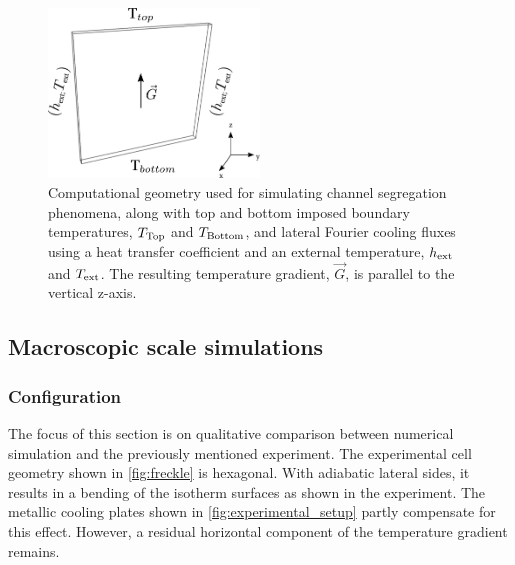 \begin{figure}[htbp]
\centering
\includegraphics[width=0.5\textwidth]{Chapter4/Graphics/freckle_fe/config.pdf}
\captionsetup{singlelinecheck=off}
\caption[.]{Computational geometry used for simulating channel segregation phenomena, along with top and bottom imposed boundary temperatures, $T_{\text{Top}}$
and $T_{\text{Bottom}}$, and lateral Fourier cooling fluxes using a heat transfer coefficient and an external temperature, $h_{\text{ext}}$ and $T_{\text{ext}}$. 
The resulting temperature gradient, $\vec{G}$, is parallel to the vertical z-axis.}
\label{fig:freckle_simu_bc}
\end{figure}

\subsection{Macroscopic scale simulations}

\subsubsection{Configuration}
The focus of this section is on qualitative comparison between numerical simulation and the previously mentioned experiment. 
The experimental cell geometry shown in \cref{fig:freckle} is hexagonal. With adiabatic lateral sides, it results in a 
bending of the isotherm surfaces as shown in the experiment. The metallic cooling plates shown in \cref{fig:experimental_setup}
partly compensate for this effect. However, a residual horizontal component of the temperature gradient 
remains. 

